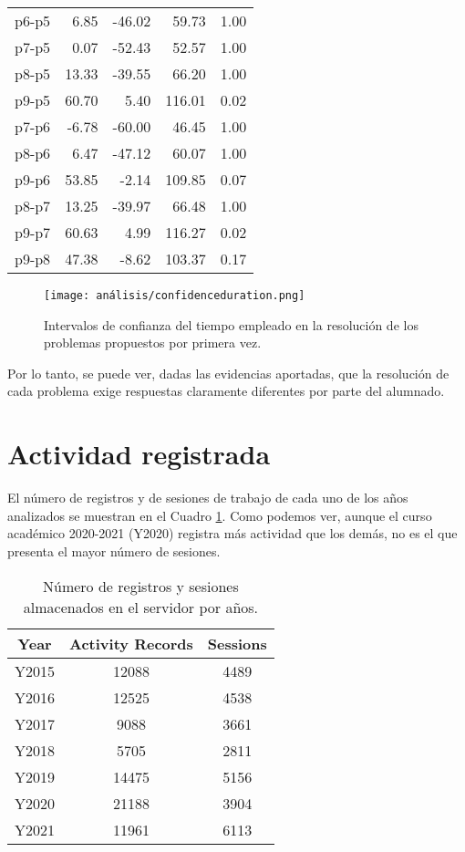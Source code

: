 \begin{table}[H]
\begin{tabular}{rrrrr}
  p6-p5 & 6.85 & -46.02 & 59.73 & 1.00 \\ 
  p7-p5 & 0.07 & -52.43 & 52.57 & 1.00 \\ 
  p8-p5 & 13.33 & -39.55 & 66.20 & 1.00 \\ 
  p9-p5 & 60.70 & 5.40 & 116.01 & 0.02 \\ 
  p7-p6 & -6.78 & -60.00 & 46.45 & 1.00 \\ 
  p8-p6 & 6.47 & -47.12 & 60.07 & 1.00 \\ 
  p9-p6 & 53.85 & -2.14 & 109.85 & 0.07 \\ 
  p8-p7 & 13.25 & -39.97 & 66.48 & 1.00 \\ 
  p9-p7 & 60.63 & 4.99 & 116.27 & 0.02 \\ 
  p9-p8 & 47.38 & -8.62 & 103.37 & 0.17 \\ 
   \hline
\end{tabular}
\end{table}

\begin{figure}[H]
    \centering
    \texttt{[image: análisis/confidenceduration.png]}
    \caption{Intervalos de confianza del tiempo empleado en la resolución de los problemas propuestos por primera vez.}
    \label{fig:confidenceduration}
\end{figure}

Por lo tanto, se puede ver, dadas las evidencias aportadas, que la resolución de cada problema exige respuestas claramente diferentes por parte del alumnado.

\section{Actividad registrada}\label{sec:activityrecorded}

El número de registros y de sesiones de trabajo de cada uno de los años analizados se muestran en el Cuadro \ref{tab:records}. Como podemos ver, aunque el curso académico 2020-2021 (Y2020) registra más actividad que los demás, no es el que presenta el mayor número de sesiones.

\begin{table}[H]
\centering
\caption{Número de registros y sesiones almacenados en el servidor por años.}
\label{tab:records}
\begin{tabular}{ccc}
\hline
\textbf{Year}  & \textbf{Activity Records} & \textbf{Sessions}  \\ \hline
Y2015 & 12088            &  4489  \\
Y2016 & 12525            &  4538  \\
Y2017 & 9088             &  3661  \\
Y2018 & 5705             &  2811  \\
Y2019 & 14475            &  5156  \\
Y2020 & 21188            &  3904  \\
Y2021 & 11961            &  6113  \\ \hline
\end{tabular}
\end{table}


